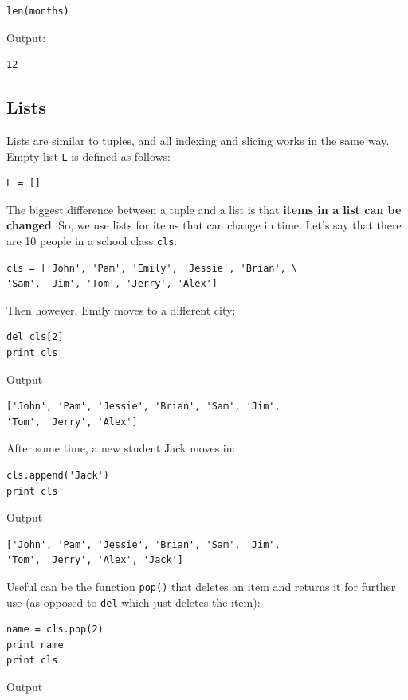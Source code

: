 \begin{verbatim}
len(months)
\end{verbatim}
Output:

\begin{verbatim}
12
\end{verbatim}

\subsection{Lists}

Lists are similar to tuples, and all indexing and slicing works in the same way. 
Empty list {\tt L} is defined as follows:

\begin{verbatim}
L = []
\end{verbatim}
The biggest difference between a tuple 
and a list is that {\bf items in a list can be changed}. So, we use
lists for items that can change in time. Let's say that there are 
10 people in a school class {\tt cls}:

\begin{verbatim}
cls = ['John', 'Pam', 'Emily', 'Jessie', 'Brian', \
'Sam', 'Jim', 'Tom', 'Jerry', 'Alex']
\end{verbatim}
Then however, Emily moves to a different city:

\begin{verbatim}
del cls[2]
print cls
\end{verbatim}
Output

\begin{verbatim}
['John', 'Pam', 'Jessie', 'Brian', 'Sam', 'Jim', 
'Tom', 'Jerry', 'Alex']
\end{verbatim}
After some time, a new student Jack moves in:

\begin{verbatim}
cls.append('Jack')
print cls
\end{verbatim}
Output

\begin{verbatim}
['John', 'Pam', 'Jessie', 'Brian', 'Sam', 'Jim', 
'Tom', 'Jerry', 'Alex', 'Jack']
\end{verbatim}
Useful can be the function {\tt pop()} that deletes an item and returns it for further
use (as opposed to {\tt del} which just deletes the item):

\begin{verbatim}
name = cls.pop(2)
print name 
print cls
\end{verbatim}
Output

